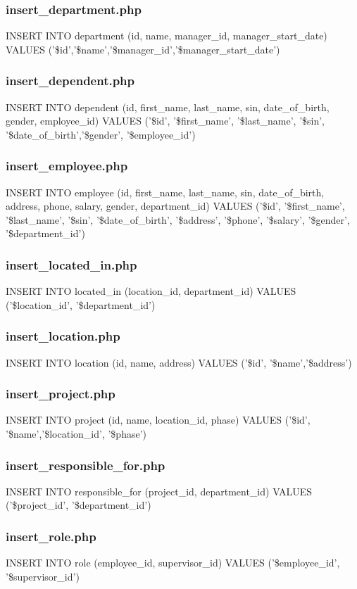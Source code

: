 \documentclass[11pt,letterpaper]{article}
\begin{document}
	\subsubsection{insert\_department.php}
	INSERT INTO department (id, name, manager\_id, manager\_start\_date) VALUES ('\$id','\$name','\$manager\_id','\$manager\_start\_date')
	\subsubsection{insert\_dependent.php}
	INSERT INTO dependent (id, first\_name, last\_name, sin, date\_of\_birth, gender, employee\_id) VALUES ('\$id', '\$first\_name', '\$last\_name', '\$sin', '\$date\_of\_birth','\$gender', '\$employee\_id')
	\subsubsection{insert\_employee.php}
	INSERT INTO employee (id, first\_name, last\_name, sin, date\_of\_birth, address, phone, salary, gender, department\_id) VALUES ('\$id', '\$first\_name', '\$last\_name', '\$sin', '\$date\_of\_birth', '\$address', '\$phone', '\$salary', '\$gender', '\$department\_id')
	\subsubsection{insert\_located\_in.php}
	INSERT INTO located\_in (location\_id, department\_id) VALUES ('\$location\_id', '\$department\_id')
	\subsubsection{insert\_location.php}
	INSERT INTO location (id, name, address) VALUES ('\$id', '\$name','\$address')
	\subsubsection{insert\_project.php}
	INSERT INTO project (id, name, location\_id, phase) VALUES ('\$id', '\$name','\$location\_id', '\$phase')
	\subsubsection{insert\_responsible\_for.php}
	INSERT INTO responsible\_for (project\_id, department\_id) VALUES ('\$project\_id', '\$department\_id')
	\subsubsection{insert\_role.php}
	INSERT INTO role (employee\_id, supervisor\_id) VALUES ('\$employee\_id', '\$supervisor\_id')
\end{document}
